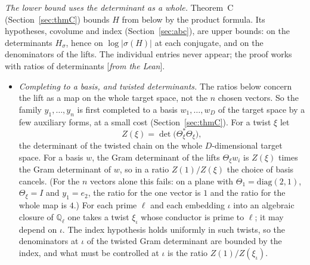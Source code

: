 \documentclass[11pt]{amsart}
\numberwithin{equation}{section}
\theoremstyle{definition}
\theoremstyle{remark}
\newcommand{\Q}{\mathbb Q}
\newcommand{\status}[1]{\textup{[\emph{#1}]}}
\begin{document}
\emph{The lower bound uses the determinant as a whole.} Theorem~C (Section~\ref{sec:thmC}) bounds $H$ from below by the product formula. Its hypotheses, covolume and index (Section~\ref{sec:abc}), are upper bounds: on the determinants $H_\sigma$, hence on $\log|\sigma(H)|$ at each conjugate, and on the denominators of the lifts. The individual entries never appear; the proof works with ratios of determinants \status{from the Lean}.
\begin{itemize}[leftmargin=2em]
\item \emph{Completing to a basis, and twisted determinants.} The ratios below concern the lift as a map on the whole target space, not the $n$ chosen vectors. So the family $y_1,\dots,y_n$ is first completed to a basis $w_1,\dots,w_D$ of the target space by a few auxiliary forms, at a small cost (Section~\ref{sec:thmC}). For a twist $\xi$ let
\begin{equation}\label{eq:Zxi}
 Z(\xi)=\det\bigl(\Theta_\xi^*\Theta_\xi\bigr),
\end{equation}
the determinant of the twisted chain on the whole $D$-dimensional target space. For a basis $w$, the Gram determinant of the lifts $\Theta_\xi w_i$ is $Z(\xi)$ times the Gram determinant of $w$, so in a ratio $Z(1)/Z(\xi)$ the choice of basis cancels. (For the $n$ vectors alone this fails: on a plane with $\Theta_1=\mathrm{diag}(2,1)$, $\Theta_\xi=I$ and $y_1=e_2$, the ratio for the one vector is $1$ and the ratio for the whole map is $4$.) For each prime $\ell$ and each embedding $\iota$ into an algebraic closure of $\Q_\ell$ one takes a twist $\xi_\iota$ whose conductor is prime to $\ell$; it may depend on $\iota$. The index hypothesis holds uniformly in such twists, so the denominators at $\iota$ of the twisted Gram determinant are bounded by the index, and what must be controlled at $\iota$ is the ratio $Z(1)/Z(\xi_\iota)$.

\end{itemize}
\end{document}

